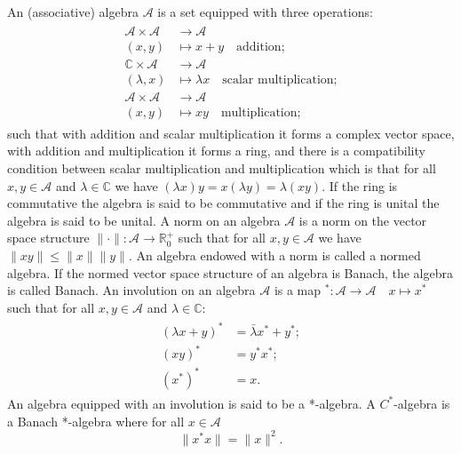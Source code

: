 \begin{definition}
An (associative) algebra $\mathcal{A}$ is a set equipped with three operations:
\begin{align}
\begin{split}
 \mathcal{A} \times \mathcal{A} & \rightarrow  \mathcal{A} \\
 (x,y) & \mapsto  x+y \quad\text{addition;}  \\
 \mathbb{C} \times \mathcal{A} & \rightarrow \mathcal{A} \\
 (\lambda,x) & \mapsto \lambda x \quad\text{scalar multiplication;} \\
 \mathcal{A} \times \mathcal{A} & \rightarrow \mathcal{A} \\
 (x, y) & \mapsto xy \quad\text{multiplication;}
\end{split}
\end{align}
such that with addition and scalar multiplication it forms a complex vector space, with addition and multiplication it forms a ring, and there is a compatibility condition between scalar multiplication and multiplication which is that for all $x,y\in\mathcal{A}$ and $\lambda\in\mathbb{C}$ we have $(\lambda x)y=x(\lambda y) = \lambda (xy)$. If the ring is commutative the algebra is said to be commutative and if the ring is unital the algebra is said to be unital. A norm on an algebra $\mathcal{A}$ is a norm on the vector space structure $\|\cdot\|:\mathcal{A} \rightarrow \mathbb{R}^{+}_0 $ such that for all $x,y\in\mathcal{A}$ we have $\|xy\|\leq\|x\|\|y\|$. An algebra endowed with a norm is called a normed algebra. If the normed vector space structure of an algebra is Banach, the algebra is called Banach. An involution on an algebra $\mathcal{A}$ is a map $^*:\mathcal{A}  \rightarrow \mathcal{A} \quad x \mapsto x^*$ such that for all $x,y\in\mathcal{A}$ and $\lambda\in\mathbb{C}$:
\begin{align}
\begin{split}
(\lambda x + y)^*&=\bar{\lambda}x^* + y^*; \\
(xy)^*&=y^*x^*;\\
(x^*)^*&=x.
\end{split}
\end{align}
An algebra equipped with an involution is said to be a *-algebra. A $C^*$-algebra is a Banach *-algebra where for all $x\in\mathcal{A}$ 
\begin{equation}
\|x^*x\|=\|x\|^2.
\end{equation}
\end{definition}

